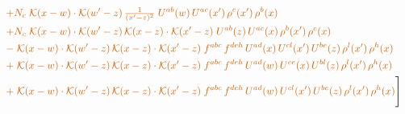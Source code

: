 \documentclass[10pt]{article}
\numberwithin{equation}{section}
\begin{document}
\begin{align}
&\quad{\color{BFK}+N_c\;\mathcal{K}(x-w)\cdot\mathcal{K}(w'-z)\,\tfrac{1}{(x'-z)^{2}}\;U^{ab}(w)\,U^{ac}(x')\,\rho^{c}(x')\,\rho^{b}(x)}\notag\\
&\quad{\color{BFK}+N_c\;\mathcal{K}(x-w)\cdot\mathcal{K}(w'-z)\,\mathcal{K}(x-z)\cdot\mathcal{K}(x'-z)\;U^{ab}(z)\,U^{ac}(x)\,\rho^{b}(x')\,\rho^{c}(x)}\notag\\
&\quad{\color{BFK}-\;\mathcal{K}(x-w)\cdot\mathcal{K}(w'-z)\,\mathcal{K}(x-z)\cdot\mathcal{K}(x'-z)\;f^{abc}\,f^{deh}\,U^{ad}(x)\,U^{cl}(x')\,U^{be}(z)\,\rho^{l}(x')\,\rho^{h}(x)}\notag\\
&\quad{\color{BFK}+\;\mathcal{K}(x-w)\cdot\mathcal{K}(w'-z)\,\mathcal{K}(x-z)\cdot\mathcal{K}(x'-z)\;f^{abc}\,f^{deh}\,U^{ad}(w)\,U^{ce}(x)\,U^{bl}(z)\,\rho^{l}(x')\,\rho^{h}(x)}\notag\\
&\quad{\color{BFK}+\;\mathcal{K}(x-w)\cdot\mathcal{K}(w'-z)\,\mathcal{K}(x-z)\cdot\mathcal{K}(x'-z)\;f^{abc}\,f^{deh}\,U^{ad}(w)\,U^{cl}(x')\,U^{be}(z)\,\rho^{l}(x')\,\rho^{h}(x)}\Bigg]\label{eq:P7}
\end{align}
\end{document}
